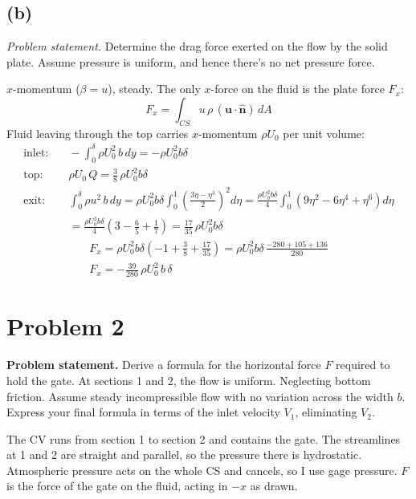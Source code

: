 \documentclass[11pt]{article}
\newcommand{\vect}[1]{\mathbf{#1}}
\begin{document}
\subsection*{(b)}

\noindent\textit{Problem statement.} Determine the drag force exerted on the flow by the solid plate.
Assume pressure is uniform, and hence there's no net pressure force.

\medskip
\noindent $x$-momentum ($\beta = u$), steady. The only $x$-force on the fluid is the plate force
$F_x$:
\begin{equation*}
F_x = \int_{CS} u\,\rho\,(\vect u\cdot\hat{\vect n})\,dA
\end{equation*}
Fluid leaving through the top carries $x$-momentum $\rho U_0$ per unit volume:
\begin{align*}
\text{inlet:}&\quad -\int_0^\delta \rho U_0^2\,b\,dy = -\rho U_0^2 b\delta \\
\text{top:}&\quad \rho U_0\,Q = \frac38\,\rho U_0^2 b\delta \\
\text{exit:}&\quad \int_0^\delta \rho u^2\,b\,dy
= \rho U_0^2 b\delta\int_0^1 \left(\frac{3\eta-\eta^3}{2}\right)^2 d\eta
= \frac{\rho U_0^2 b\delta}{4}\int_0^1 \left(9\eta^2 - 6\eta^4 + \eta^6\right) d\eta \\
&\quad = \frac{\rho U_0^2 b\delta}{4}\left(3 - \frac65 + \frac17\right)
= \frac{17}{35}\,\rho U_0^2 b\delta
\end{align*}
\begin{gather*}
F_x = \rho U_0^2 b\delta\left(-1 + \frac38 + \frac{17}{35}\right)
= \rho U_0^2 b\delta\,\frac{-280 + 105 + 136}{280} \\
\boxed{F_x = -\frac{39}{280}\,\rho U_0^2\,b\,\delta}
\end{gather*}

\section*{Problem 2}

\noindent\textbf{Problem statement.} Derive a formula for the horizontal force $F$ required to hold the
gate. At sections 1 and 2, the flow is uniform. Neglecting bottom friction. Assume steady
incompressible flow with no variation across the width $b$. Express your final formula in terms of
the inlet velocity $V_1$, eliminating $V_2$.

\medskip
\noindent The CV runs from section 1 to section 2 and contains the gate. The streamlines at 1 and 2
are straight and parallel, so the pressure there is hydrostatic. Atmospheric pressure acts on the
whole CS and cancels, so I use gage pressure. $F$ is the force of the gate on the fluid, acting in
$-x$ as drawn.
\end{document}
